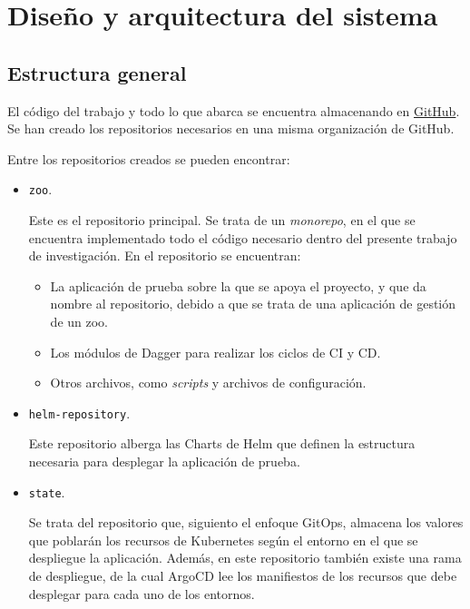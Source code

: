 \chapter{Diseño y arquitectura del sistema}

\section{Estructura general}

El código del trabajo y todo lo que abarca se encuentra almacenando en \href{https://github.com/orgs/vieites-tfg/repositories?type=source}{GitHub}. Se han creado los repositorios necesarios en una misma organización de GitHub.

Entre los repositorios creados se pueden encontrar:

\begin{itemize}
  \item \texttt{zoo}.

    Este es el repositorio principal. Se trata de un \textit{monorepo}\cite{monorepo}, en el que se encuentra implementado todo el código necesario dentro del presente trabajo de investigación. En el repositorio se encuentran:
    \begin{itemize}
      \item La aplicación de prueba sobre la que se apoya el proyecto, y que da nombre al repositorio, debido a que se trata de una aplicación de gestión de un zoo.
      \item Los módulos de Dagger para realizar los ciclos de CI y CD.
      \item Otros archivos, como \textit{scripts} y archivos de configuración.
    \end{itemize}

  \item \texttt{helm-repository}.

    Este repositorio alberga las Charts de Helm que definen la estructura necesaria para desplegar la aplicación de prueba.

  \item \texttt{state}.

    Se trata del repositorio que, siguiento el enfoque GitOps, almacena los valores que poblarán los recursos de Kubernetes según el entorno en el que se despliegue la aplicación. Además, en este repositorio también existe una rama de despliegue, de la cual ArgoCD lee los manifiestos de los recursos que debe desplegar para cada uno de los entornos.
\end{itemize}


